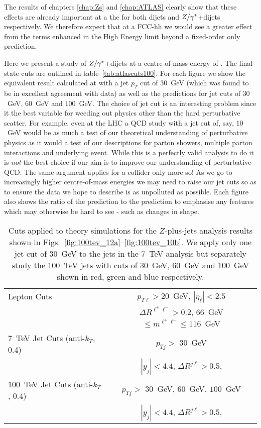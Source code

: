 	The results of chapters \ref{chap:Zs} and \ref{chap:ATLAS} clearly show that these effects are already important
	at a the \stev for both dijets and $Z/\gamma^*$+dijets respectively.  We therefore expect that at a \htev FCC-hh we would
	see a greater effect from the terms enhanced in the High Energy limit beyond a fixed-order only prediction.

	Here we present a study of $Z/\gamma^*$+dijets at a centre-of-mass energy of \htev.  The final state cuts
	are outlined in table~\eqref{tab:atlascuts100}.  For each figure we show the equivalent result calculated
	at \stev with a jet $p_T$ cut of $30$~GeV (which was found to be in excellent agreement with data) as
	well as the \htev predictions for jet cuts of $30$~GeV, $60$~GeV and $100$~GeV.  The choice of jet cut
	is an interesting problem since it the best variable for weeding out physics other than the hard
	perturbative scatter.  For example, even at the \stev LHC a QCD study with a jet cut of, say,
	$10$~GeV would be as much a test of our theoretical understanding of perturbative physics as it would
	a test of our descriptions for parton showers, multiple parton interactions and underlying event.
	While this is a perfectly valid analysis to do it is \emph{not} the best choice if our aim is to
	improve our understanding of perturbative QCD.  The same argument applies for a \htev collider
	only more so!  As we go to increasingly higher centre-of-mass energies we may need to raise our
	jet cuts so as to ensure the data we hope to describe is as unpolluted as possible.  Each figure
	also shows the ratio of the \htev prediction to the \stev prediction to emphasise any features
	which may otherwise be hard to see - such as changes in shape.

	\begin{table}[bth]
	  \centering
	  \begin{tabular}{|l|c|}
	    \hline
	    Lepton Cuts & $p_{T\ell}>20$~GeV, \; $|\eta_\ell|<2.5$ \\
	    & $\Delta R^{\ell^+\ell^-} > 0.2$, \; $66$~GeV $\leq m^{\ell^+\ell^-} \leq
	      116$~GeV \\ \hline
	    $7$~TeV Jet Cuts (anti-$k_T$, 0.4) & $p_{Tj}>$ {\color{Purple}$30$~GeV} \\
	    &  $|y_j|<4.4$, \;$\Delta R^{j\ell} >0.5$,  \\ \hline
	    $100$~TeV Jet Cuts (anti-$k_T$, 0.4) & $p_{Tj}>$ {\color{Red}$30$~GeV}, {\color{ForestGreen}$60$~GeV}, {\color{blue}$100$~GeV} \\
	    &  $|y_j|<4.4$, \;$\Delta R^{j\ell} >0.5$,  \\ \hline
	  \end{tabular}
	  \caption{Cuts applied to theory simulations for the \htev
	    $Z$-plus-jets analysis results shown in Figs.~\eqref{fig:100tev_12a}--\eqref{fig:100tev_10b}.  We apply only one
	    jet cut of 30~GeV to the jets in the 7~TeV analysis but separately study the 100~TeV jets with cuts of
	    30~GeV, 60~GeV and 100~GeV shown in red, green and blue respectively.}
	  \label{tab:atlascuts100}
	\end{table}

